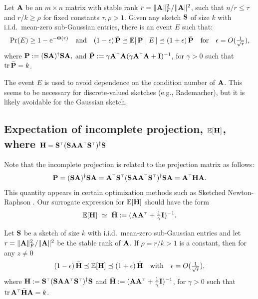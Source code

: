 \documentclass[11pt]{article}
\begin{document}
\begin{conjecture}\label{h:non-residual}
Let $\A$ be an $m\times n$ matrix with stable rank
  $r=\|\A\|_F^2/\|\A\|^2$, such that $n/r\leq\tau$ and $r/k\geq\rho$ for
 fixed constants  $\tau,\rho>1$. Given any sketch $\S$ of size $k$ with
  i.i.d.~mean-zero sub-Gaussian entries, there is an event $E$ such
  that:
\begin{align*}
  \Pr(E)\geq 1-\ee^{-\Theta(r)}\quad\text{and}\quad
  (1-\epsilon)\,\bar\P\preceq\E[\,\P\mid E\,]
  \preceq(1+\epsilon)\,\bar\P\quad\text{for}\quad
  \epsilon=O(\tfrac1{\sqrt r}),
\end{align*}
where $\P:= (\S\A)^\dagger\S\A,$ and
$\bar\P:=\gamma\A^\top\A(\gamma\A^\top\A + \I)^{-1}$,
for $\gamma>0$  such that $\tr\,\bar\P= k$.
\end{conjecture}

\noindent
The event $E$ is used to avoid dependence on the
condition number of $\A$. This seems to be necessary for
discrete-valued sketches (e.g., Rademacher), but it is likely avoidable for the Gaussian sketch.

\subsection{Expectation of incomplete projection,
  $\E[\H]$, where $\H=\S^\top(\S\A\A^\top\S^\top)^\dagger\S$} 
Note that the incomplete projection is related to the projection
matrix as follows:
\begin{align*}
  \P = (\S\A)^\dagger\S\A =
  \A^\top\S^\top(\S\A\A^\top\S^\top)^\dagger\S\A = \A^\top\H\A.
\end{align*}
This quantity appears in certain optimization methods such as Sketched
Newton-Raphson \cite{sketched-newton-raphson}.
Our surrogate expression for $\E[\H]$ should have the form
\begin{align*}
  \E[\H]\ \simeq\ \bar\H:=(\A\A^\top+\tfrac1\gamma\I)^{-1}.
\end{align*}

\begin{conjecture}
  Let $\S$ be a sketch of size $k$ with i.i.d.~mean-zero sub-Gaussian entries and let
  $r=\|\A\|_F^2/\|\A\|^2$ be the stable rank of $\A$.  If
$\rho = r/k>1$ is a constant, then for
  any $z\neq 0$
  \begin{align*}
    (1-\epsilon)\,\bar\H\preceq\E[\H]\preceq
    (1+\epsilon)\,\bar\H\quad\text{with}\quad \epsilon =
    O(\tfrac1{\sqrt r}),
  \end{align*}
  where $\H := \S^\top(\S\A\A^\top\S^\top)^\dagger\S$
  and $\bar\H:=(\A\A^\top+\frac1\gamma\I)^{-1}$, for $\gamma>0$ such
  that $\tr\,\A^\top\bar\H\A = k$.
\end{conjecture}
\end{document}

